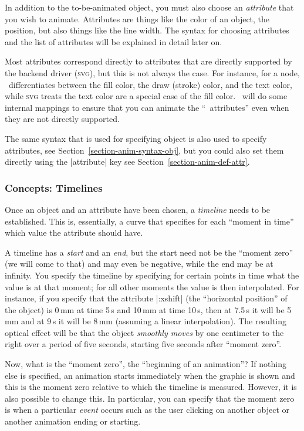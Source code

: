 In addition to the to-be-animated object, you must also choose an
\emph{attribute} that you wish to animate. Attributes are things like the color
of an object, the position, but also things like the line width. The syntax for
choosing attributes and the list of attributes will be explained in detail
later on.

Most attributes correspond directly to attributes that are directly supported
by the backend driver (\textsc{svg}), but this is not always the case. For
instance, for a node, \tikzname\ differentiates between the fill color, the
draw (stroke) color, and the text color, while \textsc{svg} treats the text
color are a special case of the fill color. \tikzname\ will do some internal
mappings to ensure that you can animate the ``\tikzname\ attributes'' even when
they are not directly supported.

The same syntax that is used for specifying object is also used to specify
attributes, see Section~\ref{section-anim-syntax-obj}, but you could also set
them directly using the |attribute| key see
Section~\ref{section-anim-def-attr}.


\subsubsection{Concepts: Timelines}

Once an object and an attribute have been chosen, a \emph{timeline} needs to be
established. This is, essentially, a curve that specifies for each ``moment in
time'' which value the attribute should have.

A timeline has a \emph{start} and an \emph{end}, but the start need not be the
``moment zero'' (we will come to that) and may even be negative, while the end
may be at infinity. You specify the timeline by specifying for certain points
in time what the value is at that moment; for all other moments the value is
then interpolated. For instance, if you specify that the attribute |:xshift|
(the ``horizontal position'' of the object) is 0\,mm at time 5\,s and 10\,mm at
time 10\,s, then at 7.5\,s it will be 5\,mm and at 9\,s it will be 8\,mm
(assuming a linear interpolation). The resulting optical effect will be that
the object \emph{smoothly moves} by one centimeter to the right over a period
of five seconds, starting five seconds after ``moment zero''.

Now, what is the ``moment zero'', the ``beginning of an animation''? If nothing
else is specified, an animation starts immediately when the graphic is shown
and this is the moment zero relative to which the timeline is measured.
However, it is also possible to change this. In particular, you can specify
that the moment zero is when a particular \emph{event} occurs such as the user
clicking on another object or another animation ending or starting.

